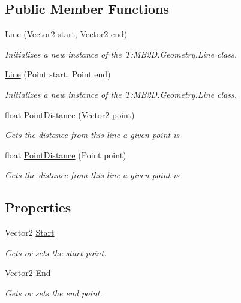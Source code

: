\subsection*{Public Member Functions}
\begin{DoxyCompactItemize}
\item 
\hyperlink{class_m_b2_d_1_1_geometry_1_1_line_a72a1804c7d045920d82ed26689fe10c6}{Line} (Vector2 start, Vector2 end)
\begin{DoxyCompactList}\small\item\em Initializes a new instance of the T\+:\+M\+B2\+D.\+Geometry.\+Line class. \end{DoxyCompactList}\item 
\hyperlink{class_m_b2_d_1_1_geometry_1_1_line_a7c3e02a1c56c94be46ce9ad55eaa87b8}{Line} (Point start, Point end)
\begin{DoxyCompactList}\small\item\em Initializes a new instance of the T\+:\+M\+B2\+D.\+Geometry.\+Line class. \end{DoxyCompactList}\item 
float \hyperlink{class_m_b2_d_1_1_geometry_1_1_line_ae5d02b1abab30bf1c8f471df2061749f}{Point\+Distance} (Vector2 point)
\begin{DoxyCompactList}\small\item\em Gets the distance from this line a given point is \end{DoxyCompactList}\item 
float \hyperlink{class_m_b2_d_1_1_geometry_1_1_line_a5cbeb68ba1f9f2c8a191f4593a234fa8}{Point\+Distance} (Point point)
\begin{DoxyCompactList}\small\item\em Gets the distance from this line a given point is \end{DoxyCompactList}\end{DoxyCompactItemize}
\subsection*{Properties}
\begin{DoxyCompactItemize}
\item 
Vector2 \hyperlink{class_m_b2_d_1_1_geometry_1_1_line_aa02111d13427d3b169c73bb354f7bb53}{Start}
\begin{DoxyCompactList}\small\item\em Gets or sets the start point. \end{DoxyCompactList}\item 
Vector2 \hyperlink{class_m_b2_d_1_1_geometry_1_1_line_a17eb89f60f0bb666884655d4efd18be5}{End}
\begin{DoxyCompactList}\small\item\em Gets or sets the end point. \end{DoxyCompactList}\end{DoxyCompactItemize}


